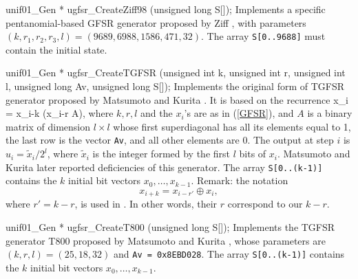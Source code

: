 unif01_Gen * ugfsr_CreateZiff98 (unsigned long S[]);
\endcode
  \tab Implements a specific pentanomial-based GFSR generator proposed
%
  by Ziff \cite{rZIF98a}, with parameters $(k, r_1, r_2, r_3, l) =
  (9689, 6988, 1586, 471, 32)$.
  The array {\tt S[0..9688]} must contain the initial state.
  \endtab


\code

unif01_Gen * ugfsr_CreateTGFSR (unsigned int k, unsigned int r,
                                unsigned int l, unsigned long Av,
                                unsigned long S[]);
\endcode
  \tab Implements the original form of TGFSR generator proposed by
   Matsumoto and Kurita \cite{rMAT92a}.  It is based on the recurrence
   \eq
      x_i = x_{i-k} \oplus (x_{i-r} A),
   \endeq
   where $k, r, l$ and the $x_i$'s are as in (\ref{GFSR}),
   and $A$ is a binary matrix of dimension $l \times l$ whose first
   superdiagonal has all its elements equal to 1, the last
   row is the vector {\tt Av}, and all other elements are 0.
   The output at step $i$ is $u_i = \tilde x_i/2^l$, where
   $\tilde x_i$ is the integer formed by the first $l$ bits of $x_i$.
   Matsumoto and Kurita \cite{rMAT94a} later reported deficiencies
   of this generator.
  The array {\tt S[0..(k-1)]} contains the $k$ initial bit vectors
   $x_0, \dots, x_{k-1}$.
   Remark:  the notation
     $$ x_{i+k} = x_{i-r'} \oplus x_{i}, $$
   where $r' = k-r$, is used in \cite{rMAT94a}.
   In other words, their $r$ correspond to our $k-r$.
  \endtab
\code


unif01_Gen * ugfsr_CreateT800 (unsigned long S[]);
\endcode
  \tab Implements the TGFSR generator T800  proposed by
%
   Matsumoto and Kurita \cite{rMAT94a}, whose  parameters are
   $(k,r,l) = (25,18,32)$ and {\tt Av = 0x8EBD028}.
   The array {\tt S[0..(k-1)]} contains the $k$ initial bit vectors
   $x_0, \dots, x_{k-1}$.
  \endtab
\code


